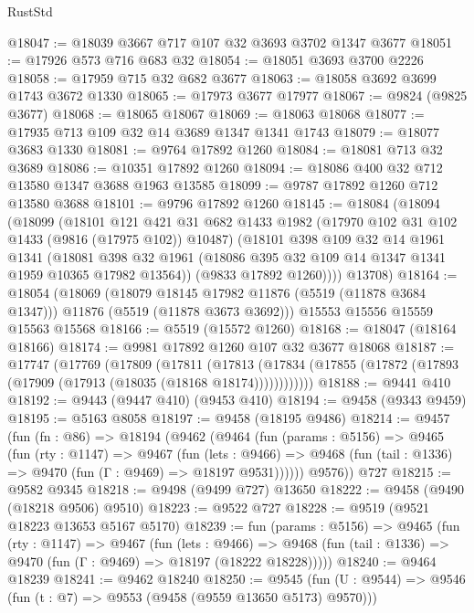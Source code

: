 \begin{lexlean}{RustStd}
\begin{coremodule}
@18047 := @18039 @3667 @717 @107 @32 @3693 @3702 @1347 @3677
@18051 := @17926 @573 @716 @683 @32
@18054 := @18051 @3693 @3700 @2226
@18058 := @17959 @715 @32 @682 @3677
@18063 := @18058 @3692 @3699 @1743 @3672 @1330
@18065 := @17973 @3677 @17977
@18067 := @9824 (@9825 @3677)
@18068 := @18065 @18067
@18069 := @18063 @18068
@18077 := @17935 @713 @109 @32 @14 @3689 @1347 @1341 @1743
@18079 := @18077 @3683 @1330
@18081 := @9764 @17892 @1260
@18084 := @18081 @713 @32 @3689
@18086 := @10351 @17892 @1260
@18094 := @18086 @400 @32 @712 @13580 @1347 @3688 @1963 @13585
@18099 := @9787 @17892 @1260 @712 @13580 @3688
@18101 := @9796 @17892 @1260
@18145 := @18084
    (@18094
      (@18099
        (@18101
          @121
          @421
          @31
          @682
          @1433
          @1982
          (@17970 @102 @31 @102 @1433 (@9816 (@17975 @102)) @10487)
          (@18101
            @398
            @109
            @32
            @14
            @1961
            @1341
            (@18081
              @398
              @32
              @1961
              (@18086 @395 @32 @109 @14 @1347 @1341 @1959 @10365 @17982 @13564))
            (@9833 @17892 @1260))))
      @13708)
@18164 := @18054
    (@18069
      (@18079 @18145 @17982 @11876 (@5519 (@11878 @3684 @1347)))
      @11876
      (@5519 (@11878 @3673 @3692)))
    @15553
    @15556
    @15559
    @15563
    @15568
@18166 := @5519 (@15572 @1260)
@18168 := @18047 (@18164 @18166)
@18174 := @9981 @17892 @1260 @107 @32 @3677 @18068
@18187 := @17747
    (@17769
      (@17809
        (@17811
          (@17813 (@17834 (@17855 (@17872 (@17893 (@17909 (@17913 (@18035 (@18168 @18174))))))))))))
@18188 := @9441 @410
@18192 := @9443 (@9447 @410) (@9453 @410)
@18194 := @9458 (@9343 @9459)
@18195 := @5163 @8058
@18197 := @9458 (@18195 @9486)
@18214 := @9457
    (fun (fn : @86) =>
    @18194
      (@9462
        (@9464
          (fun (params : @5156) =>
          @9465
            (fun (rty : @1147) =>
            @9467
              (fun (lets : @9466) =>
              @9468 (fun (tail : @1336) => @9470 (fun (Γ : @9469) => @18197 @9531))))))
        @9576))
    @727
@18215 := @9582 @9345
@18218 := @9498 (@9499 @727) @13650
@18222 := @9458 (@9490 (@18218 @9506) @9510)
@18223 := @9522 @727
@18228 := @9519 (@9521 @18223 @13653 @5167 @5170)
@18239 := fun (params : @5156) =>
  @9465
    (fun (rty : @1147) =>
    @9467
      (fun (lets : @9466) =>
      @9468 (fun (tail : @1336) => @9470 (fun (Γ : @9469) => @18197 (@18222 @18228)))))
@18240 := @9464 @18239
@18241 := @9462 @18240
@18250 := @9545
    (fun (U : @9544) => @9546 (fun (t : @7) => @9553 (@9458 (@9559 @13650 @5173) @9570)))

\end{coremodule}
\end{lexlean}
